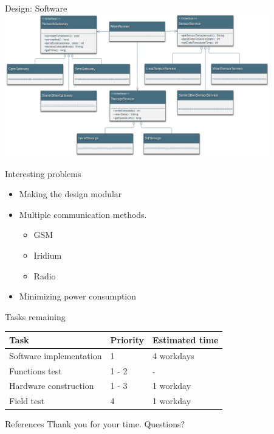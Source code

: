 \documentclass{beamer}
\begin{document}
\begin{frame}{Design: Software}
\centering
\includegraphics[width=11.5cm]{graphics/ClassDiagram.png}
\end{frame}

\begin{frame}{Interesting problems}
\begin{itemize}
\item Making the design modular
\item Multiple communication methods.
	\begin{itemize}
	\item GSM
	\item Iridium
	\item Radio
	\end{itemize}
\item Minimizing power consumption
\end{itemize}
\end{frame}

\begin{frame}{Tasks remaining}
	\begin{tabular}{ | l | l | l |}
    \hline
    \textbf{Task} & \textbf{Priority} & \textbf{Estimated time}\\ \hline
    Software implementation & 1 & 4 workdays \\ \hline
    Functions test & 1 - 2 & - \\ \hline
	Hardware construction & 1 - 3 & 1 workday\\ \hline
	Field test & 4 & 1 workday\\ \hline
    \end{tabular}
\end{frame}

\begin{frame}{References}
Thank you for your time.
Questions?

{\tiny }
\end{frame}
\end{document}
